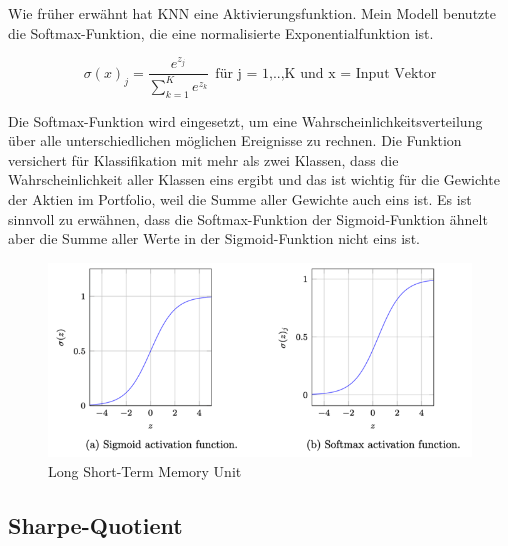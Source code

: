 \documentclass[12pt]{article}
\begin{document}
            Wie früher erwähnt hat KNN eine Aktivierungsfunktion. Mein Modell benutzte die Softmax-Funktion, 
            die eine normalisierte Exponentialfunktion ist. 
            
            \[ \sigma(x)_j = \frac{e^{z_j}}{\sum_{k=1}^{K} e^{z_k}} \ \ \textrm{für j = 1,..,K und x = Input Vektor}  \]
            
            Die Softmax-Funktion wird eingesetzt, 
            um eine Wahrscheinlichkeitsverteilung über alle unterschiedlichen möglichen Ereignisse zu rechnen. 
            Die Funktion versichert für Klassifikation mit mehr als zwei Klassen, 
            dass die Wahrscheinlichkeit aller Klassen eins ergibt und das ist wichtig für die Gewichte der Aktien im Portfolio, 
            weil die Summe aller Gewichte auch eins ist. Es ist sinnvoll zu erwähnen, 
            dass die Softmax-Funktion der Sigmoid-Funktion ähnelt aber die Summe aller Werte in der Sigmoid-Funktion nicht eins ist.

            \begin{figure}[ht]
            
                \begin{center}

                    \includegraphics[scale=0.6]{sigmoid-datacamp.png}
                    \caption{Long Short-Term Memory Unit \cite{data-basecamp}}
        
                \end{center}
                
            \end{figure}

        \subsection{Sharpe-Quotient}
\end{document}
